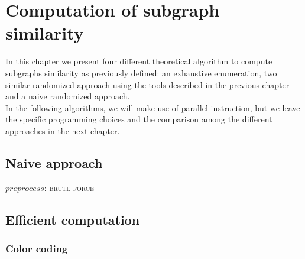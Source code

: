 \chapter{Computation of subgraph similarity}

	In this chapter we present four different theoretical algorithm to compute subgraphs similarity as previously defined: an exhaustive enumeration, two similar randomized approach using the tools described in the previous chapter and a naive randomized approach.\\
	
	In the following algorithms, we will make use of parallel instruction, but we leave the specific programming choices and the comparison among the different approaches in the next chapter.
	
\section{Naive approach}

    \begin{algorithm}[h]
    
    \small
    \DontPrintSemicolon
    
    \BlankLine
    
    

    
    \caption{$preprocess$: \textsc{brute-force}}
    
    \label{alg:color-coding}
    \end{algorithm}

\clearpage

\section{Efficient computation}

\clearpage

\subsection*{Color coding}

